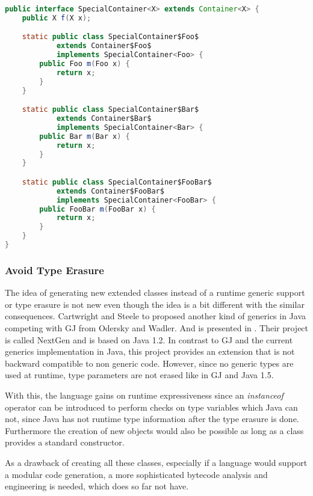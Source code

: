\begin{lstlisting}[language=java,caption=Extending a container class translated to Java,label=lst:extendingContainer]
public interface SpecialContainer<X> extends Container<X> {
	public X f(X x);

	static public class SpecialContainer$Foo$
			extends Container$Foo$
			implements SpecialContainer<Foo> {
		public Foo m(Foo x) {
			return x;
		}
	}

	static public class SpecialContainer$Bar$
			extends Container$Bar$
			implements SpecialContainer<Bar> {
		public Bar m(Bar x) {
			return x;
		}
	}

	static public class SpecialContainer$FooBar$
			extends Container$FooBar$
			implements SpecialContainer<FooBar> {
		public FooBar m(FooBar x) {
			return x;
		}
	}
}
\end{lstlisting}

\subsubsection{Avoid Type Erasure}
The idea of generating new extended classes instead of a runtime generic
support or type erasure is not new even though the idea is a bit different
with the similar consequences.  Cartwright and Steele to proposed
another kind of generics in Java competing with GJ from Odersky and
Wadler. And is presented in \cite{cartwright_compatible_1998}. Their
project is called NextGen and is based on Java 1.2. In contrast to GJ
and the current generics implementation in Java, this project provides an
extension that is not backward compatible to non generic code. However,
since no generic types are used at runtime, type parameters are not
erased like in GJ and Java 1.5.

With this, the language gains on runtime expressiveness since an
\emph{instanceof} operator can be introduced to perform checks on type
variables which Java can not, since Java has not runtime type information
after the type erasure is done. Furthermore the creation of new objects
would also be possible as long as a class provides a standard constructor.

As a drawback of creating all these classes, especially  if a language
would support a modular code generation, a more sophisticated bytecode
analysis and engineering is needed, which \ooplss does so far not have.

